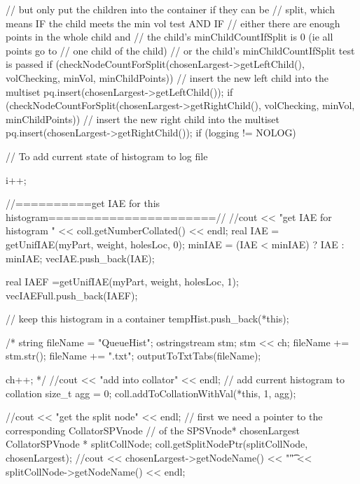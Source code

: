 \begin{DoxyCode}
{{{            // but only put the children into the container if they can be
            // split, which means IF the child meets the min vol test AND IF
            // either there are enough points in the whole child and
                // the child's minChildCountIfSplit is 0 (ie all points go to
                // one child of the child)
            // or the child's minChildCountIfSplit test is passed
            if (checkNodeCountForSplit(chosenLargest->getLeftChild(),
                    volChecking, minVol, minChildPoints)) {
                // insert the new left child into the multiset
                pq.insert(chosenLargest->getLeftChild());
            }
            if (checkNodeCountForSplit(chosenLargest->getRightChild(),
                    volChecking, minVol, minChildPoints)) {
                // insert the new right child into the multiset
                pq.insert(chosenLargest->getRightChild());
            }
            if (logging != NOLOG) {
                // To add current state of histogram to log file               
          
                i++;
            }

          //==========get IAE for this histogram======================//
        //cout << "get IAE for histogram " << coll.getNumberCollated() << endl;
        real IAE = getUnifIAE(myPart, weight, holesLoc, 0);
        minIAE = (IAE < minIAE) ? IAE : minIAE;
        vecIAE.push_back(IAE); 
        
        real IAEF =getUnifIAE(myPart, weight, holesLoc, 1);
        vecIAEFull.push_back(IAEF); 
        
        
        // keep this histogram in a container 
        tempHist.push_back(*this);
        
        /*
        string fileName = "QueueHist";
        ostringstream stm;
        stm << ch;
        fileName += stm.str();
        fileName += ".txt";
        outputToTxtTabs(fileName);
        
        ch++;
        */
        //cout << "add into collator" << endl;
        // add current histogram to collation
        size_t agg = 0;
        coll.addToCollationWithVal(*this, 1, agg);
          
        //cout << "get the split node" << endl;
        // first we need a pointer to the corresponding CollatorSPVnode 
        // of the SPSVnode* chosenLargest     
        CollatorSPVnode * splitCollNode;
        coll.getSplitNodePtr(splitCollNode, chosenLargest);
        //cout << chosenLargest->getNodeName() << "\t" <<
       splitCollNode->getNodeName() << endl;
        
}}}
\end{DoxyCode}
